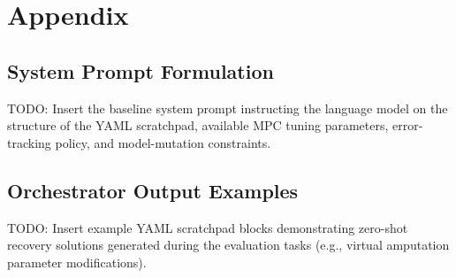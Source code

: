 \section*{Appendix}
\label{sec:appendix}

\subsection{System Prompt Formulation}
TODO: Insert the baseline system prompt instructing the language model on the structure of the YAML scratchpad, available MPC tuning parameters, error-tracking policy, and model-mutation constraints.

\subsection{Orchestrator Output Examples}
TODO: Insert example YAML scratchpad blocks demonstrating zero-shot recovery solutions generated during the evaluation tasks (e.g., virtual amputation parameter modifications).
